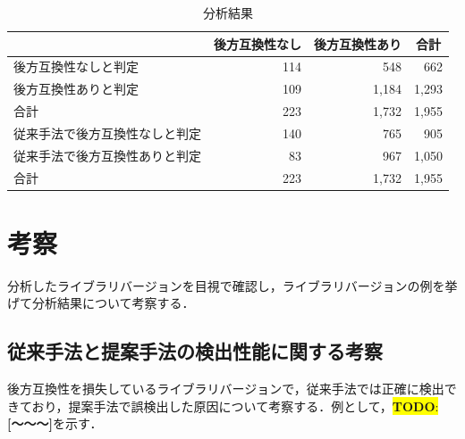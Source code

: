 \documentclass[11pt,dvipdfmx]{jreport}
\newcommand{\todo}[1]{\colorbox{yellow}{{\bf TODO}:}{\color{red} {\textbf{[#1]}}}}
\begin{document}
\begin{table}[]
  \centering
  \caption{分析結果}
  \label{fig:result}
  \begin{tabular}{l|r|r|r}
    \hline
                    & \multicolumn{1}{c|}{後方互換性なし} & \multicolumn{1}{c|}{後方互換性あり} & \multicolumn{1}{c}{合計} \\ \hline
    後方互換性なしと判定      & 114                          & 548                          & 662                    \\ \hline
    後方互換性ありと判定      & 109                          & 1,184                        & 1,293                  \\ \hline
    合計              & 223                          & 1,732                        & 1,955                  \\ \hline\hline
    従来手法で後方互換性なしと判定 & 140                          & 765                          & 905                    \\ \hline
    従来手法で後方互換性ありと判定 & 83                           & 967                          & 1,050                  \\ \hline
    合計              & 223                          & 1,732                        & 1,955                  \\ \hline
  \end{tabular}
\end{table}


\section{考察}\label{rq2:kousatu}
分析したライブラリバージョンを目視で確認し，ライブラリバージョンの例を挙げて分析結果について考察する．

\subsection{従来手法と提案手法の検出性能に関する考察}
後方互換性を損失しているライブラリバージョンで，従来手法では正確に検出できており，提案手法で誤検出した原因について考察する．例として，\todo{〜〜〜}を示す．

\end{document}
